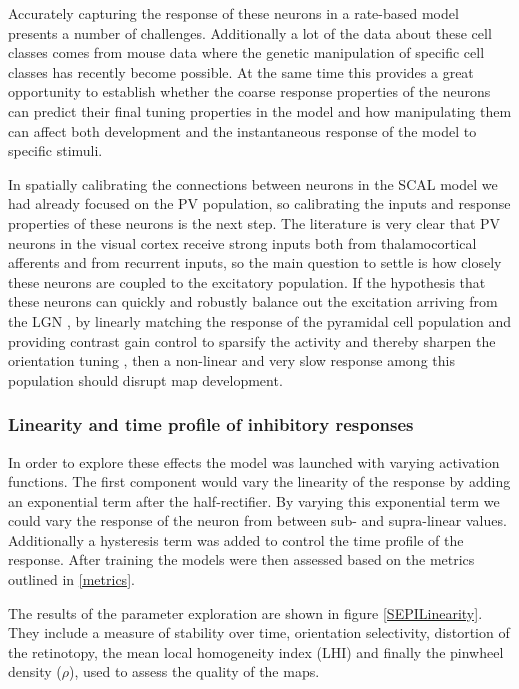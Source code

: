 Accurately capturing the response of these neurons in a rate-based
model presents a number of challenges. Additionally a lot of the data
about these cell classes comes from mouse data where the genetic
manipulation of specific cell classes has recently become possible. At
the same time this provides a great opportunity to establish whether
the coarse response properties of the neurons can predict their final
tuning properties in the model and how manipulating them can affect
both development and the instantaneous response of the model to
specific stimuli.

In spatially calibrating the connections between neurons in the SCAL
model we had already focused on the PV population, so calibrating the
inputs and response properties of these neurons is the next step. The
literature is very clear that PV neurons in the visual cortex receive
strong inputs both from thalamocortical afferents and from recurrent
inputs, so the main question to settle is how closely these neurons
are coupled to the excitatory population. If the hypothesis that these
neurons can quickly and robustly balance out the excitation arriving
from the LGN \citep{Swadlow2003, Burkhalter2008}, by linearly matching
the response of the pyramidal cell population and providing contrast
gain control to sparsify the activity and thereby sharpen the
orientation tuning \citep{Wilson2012}, then a non-linear and very slow
response among this population should disrupt map development.

\subsubsection{Linearity and time profile of inhibitory responses}

In order to explore these effects the model was launched with varying
activation functions. The first component would vary the linearity of
the response by adding an exponential term after the
half-rectifier. By varying this exponential term we could vary the
response of the neuron from between sub- and supra-linear
values. Additionally a hysteresis term was added to control the time
profile of the response. After training the models were then assessed
based on the metrics outlined in \ref{metrics}.

The results of the parameter exploration are shown in figure
\ref{SEPILinearity}. They include a measure of stability over time,
orientation selectivity, distortion of the retinotopy, the mean local
homogeneity index (LHI) and finally the pinwheel density ($\rho$),
used to assess the quality of the maps.

